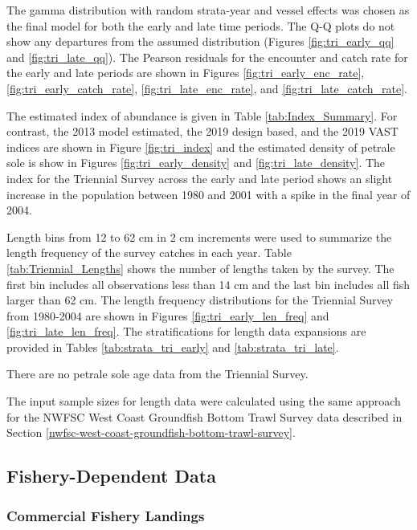 \documentclass[12pt,]{article}
\begin{document}
The gamma distribution with random strata-year and vessel effects was
chosen as the final model for both the early and late time periods. The
Q-Q plots do not show any departures from the assumed distribution
(Figures \ref{fig:tri_early_qq} and \ref{fig:tri_late_qq}). The Pearson
residuals for the encounter and catch rate for the early and late
periods are shown in Figures \ref{fig:tri_early_enc_rate},
\ref{fig:tri_early_catch_rate}, \ref{fig:tri_late_enc_rate}, and
\ref{fig:tri_late_catch_rate}.

The estimated index of abundance is given in Table
\ref{tab:Index_Summary}. For contrast, the 2013 model estimated, the
2019 design based, and the 2019 VAST indices are shown in Figure
\ref{fig:tri_index} and the estimated density of petrale sole is show in
Figures \ref{fig:tri_early_density} and \ref{fig:tri_late_density}. The
index for the Triennial Survey across the early and late period shows an
slight increase in the population between 1980 and 2001 with a spike in
the final year of 2004.

Length bins from 12 to 62 cm in 2 cm increments were used to summarize
the length frequency of the survey catches in each year. Table
\ref{tab:Triennial_Lengths} shows the number of lengths taken by the
survey. The first bin includes all observations less than 14 cm and the
last bin includes all fish larger than 62 cm. The length frequency
distributions for the Triennial Survey from 1980-2004 are shown in
Figures \ref{fig:tri_early_len_freq} and \ref{fig:tri_late_len_freq}.
The stratifications for length data expansions are provided in Tables
\ref{tab:strata_tri_early} and \ref{tab:strata_tri_late}.

There are no petrale sole age data from the Triennial Survey.

The input sample sizes for length data were calculated using the same
approach for the NWFSC West Coast Groundfish Bottom Trawl Survey data
described in Section
\ref{nwfsc-west-coast-groundfish-bottom-trawl-survey}.

\subsection{Fishery-Dependent Data}\label{fishery-dependent-data}

\subsubsection{Commercial Fishery
Landings}\label{commercial-fishery-landings}
\end{document}
